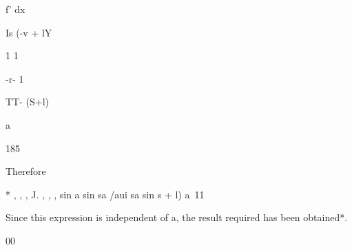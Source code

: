 f' dx

Is (-v + lY














1 1
















-r- 1








 TT- (S+l)


a





185



Therefore



* , , , J. , , , sin a sin sa /aui sa sin s + l) a\ 11






Since this expression is independent of a, the result required has
been obtained*.

00

